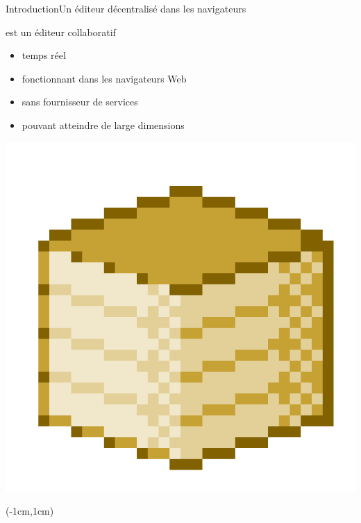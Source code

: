\begin{frame}{Introduction}{Un éditeur décentralisé dans les navigateurs}
  

  \begin{minipage}{0.69\textwidth}
    \CRATE est un éditeur collaboratif 
    \begin{itemize}
    \item temps réel \YES{\cmark}
    \item fonctionnant dans les navigateurs Web \YES{\cmark}
    \item sans fournisseur de services \YES{\cmark}
    \item pouvant atteindre de large dimensions \YES{\cmark}
    \end{itemize}
  \end{minipage}
  \begin{minipage}{0.3\textwidth}
    \includegraphics[width=\textwidth,interpolate=false]{img/crateicon.png}
  \end{minipage}
    
  
  \begin{textblock*}{1.18\textwidth}(-1cm,1cm)
  \end{textblock*}
  
  \vspace{1cm}

\end{frame}


